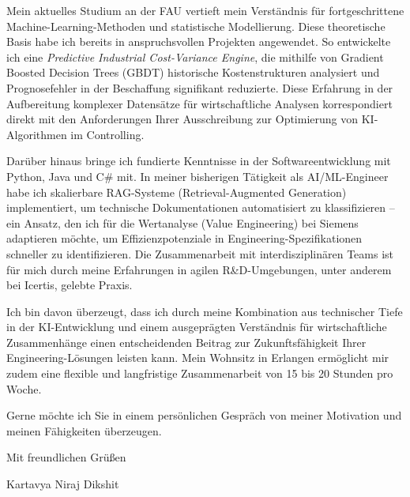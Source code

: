 \documentclass[a4paper,10pt]{article}
\begin{document}
Mein aktuelles Studium an der FAU vertieft mein Verständnis für fortgeschrittene Machine-Learning-Methoden und statistische Modellierung. Diese theoretische Basis habe ich bereits in anspruchsvollen Projekten angewendet. So entwickelte ich eine \textit{Predictive Industrial Cost-Variance Engine}, die mithilfe von Gradient Boosted Decision Trees (GBDT) historische Kostenstrukturen analysiert und Prognosefehler in der Beschaffung signifikant reduzierte. Diese Erfahrung in der Aufbereitung komplexer Datensätze für wirtschaftliche Analysen korrespondiert direkt mit den Anforderungen Ihrer Ausschreibung zur Optimierung von KI-Algorithmen im Controlling.

Darüber hinaus bringe ich fundierte Kenntnisse in der Softwareentwicklung mit Python, Java und C# mit. In meiner bisherigen Tätigkeit als AI/ML-Engineer habe ich skalierbare RAG-Systeme (Retrieval-Augmented Generation) implementiert, um technische Dokumentationen automatisiert zu klassifizieren – ein Ansatz, den ich für die Wertanalyse (Value Engineering) bei Siemens adaptieren möchte, um Effizienzpotenziale in Engineering-Spezifikationen schneller zu identifizieren. Die Zusammenarbeit mit interdisziplinären Teams ist für mich durch meine Erfahrungen in agilen R&D-Umgebungen, unter anderem bei Icertis, gelebte Praxis.

Ich bin davon überzeugt, dass ich durch meine Kombination aus technischer Tiefe in der KI-Entwicklung und einem ausgeprägten Verständnis für wirtschaftliche Zusammenhänge einen entscheidenden Beitrag zur Zukunftsfähigkeit Ihrer Engineering-Lösungen leisten kann. Mein Wohnsitz in Erlangen ermöglicht mir zudem eine flexible und langfristige Zusammenarbeit von 15 bis 20 Stunden pro Woche.

Gerne möchte ich Sie in einem persönlichen Gespräch von meiner Motivation und meinen Fähigkeiten überzeugen.

Mit freundlichen Grüßen

\vspace{20pt}

Kartavya Niraj Dikshit
\end{document}
